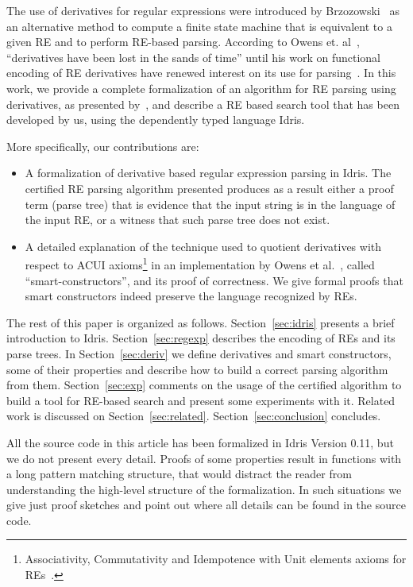 \documentclass{llncs}
\begin{document}
The use of derivatives for regular expressions were introduced by
Brzozowski~\cite{Brzozowski1964} as an alternative method to compute a
finite state machine that is equivalent to a given RE and to perform
RE-based parsing. According to Owens et. al~\cite{Owens2009},
``derivatives have been lost in the sands of time'' until his work on
functional encoding of RE derivatives have renewed interest on its use
for parsing~\cite{Might2011,Fischer2010}.  In this work, we provide a
complete formalization of an algorithm for RE parsing using
derivatives, as presented by~\cite{Owens2009}, and describe a RE based
search tool that has been developed by us, using the dependently typed
language Idris.

More specifically, our contributions are:
\begin{itemize}
  \item A formalization of derivative based regular expression parsing
    in Idris. The certified RE parsing algorithm presented produces as
    a result either a proof term (parse tree) that is evidence that
    the input string is in the language of the input RE, or a witness
    that such parse tree does not exist.

  \item A detailed explanation of the technique used to quotient
    derivatives with respect to ACUI axioms\footnote{Associativity,
      Commutativity and Idempotence with Unit elements axioms for
      REs~\cite{Brzozowski1964}.} in an implementation by Owens et
    al.~\cite{Owens2009}, called ``smart-constructors'', and its proof
    of correctness. We give formal proofs that smart constructors
    indeed preserve the language recognized by REs.
\end{itemize}

The rest of this paper is organized as
follows. Section~\ref{sec:idris} presents a brief introduction to
Idris. Section~\ref{sec:regexp} describes the encoding of REs and its
parse trees. In Section~\ref{sec:deriv} we define derivatives and
smart constructors, some of their properties and describe how to build
a correct parsing algorithm from them. Section~\ref{sec:exp} comments
on the usage of the certified algorithm to build a tool for RE-based
search and present some experiments with it. Related work is discussed
on Section~\ref{sec:related}.  Section~\ref{sec:conclusion} concludes.

All the source code in this article has been formalized in Idris
Version 0.11, but
we do not present every detail. Proofs of some properties result in
functions with a long pattern matching structure, that would distract
the reader from understanding the high-level structure of the
formalization. In such situations we give just proof sketches and point
out where all details can be found in the source code.
\end{document}
